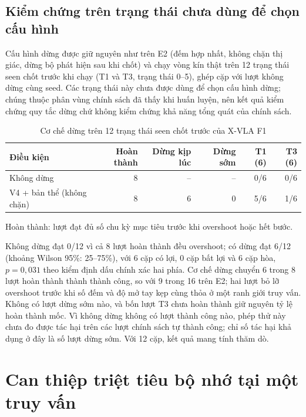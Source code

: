 \subsection{Kiểm chứng trên trạng thái chưa dùng để chọn cấu hình}
\label{sec:halt-seen12}

Cấu hình dừng được giữ nguyên như trên E2 (đếm hợp nhất, không chặn thị giác, dừng bộ phát hiện sau khi chốt) và chạy vòng kín thật trên 12 trạng thái seen chốt trước khi chạy (T1 và T3, trạng thái 0--5), ghép cặp với lượt không dừng cùng seed. Các trạng thái này chưa được dùng để chọn cấu hình dừng; chúng thuộc phân vùng chính sách đã thấy khi huấn luyện, nên kết quả kiểm chứng quy tắc dừng chứ không kiểm chứng khả năng tổng quát của chính sách.

\begin{table}[htbp]
\centering\small
\caption{Cơ chế dừng trên 12 trạng thái seen chốt trước của X-VLA F1}
\label{tab:halt-seen12}
\begin{tabular}{l|r|r|r|r|r}
\toprule
\textbf{Điều kiện} & \textbf{Hoàn thành} & \textbf{Dừng kịp lúc} & \textbf{Dừng sớm} & \textbf{T1 (6)} & \textbf{T3 (6)} \\
\midrule
Không dừng & 8 & -- & -- & 0/6 & 0/6 \\
V4 + bản thể (không chặn) & 8 & 6 & 0 & 5/6 & 1/6 \\
\bottomrule
\end{tabular}
\par\smallskip
{\footnotesize Hoàn thành: lượt đạt đủ số chu kỳ mục tiêu trước khi overshoot hoặc hết bước.\par}
\end{table}

Không dừng đạt 0/12 vì cả 8 lượt hoàn thành đều overshoot; có dừng đạt 6/12 (khoảng Wilson 95\%: 25--75\%), với 6 cặp có lợi, 0 cặp bất lợi và 6 cặp hòa, $p = 0{,}031$ theo kiểm định dấu chính xác hai phía. Cơ chế dừng chuyển 6 trong 8 lượt hoàn thành thành thành công, so với 9 trong 16 trên E2; hai lượt bỏ lỡ overshoot trước khi số đếm và độ mở tay kẹp cùng thỏa ở một ranh giới truy vấn. Không có lượt dừng sớm nào, và bốn lượt T3 chưa hoàn thành giữ nguyên tỷ lệ hoàn thành mốc. Vì không dừng không có lượt thành công nào, phép thử này chưa đo được tác hại trên các lượt chính sách tự thành công; chỉ số tác hại khả dụng ở đây là số lượt dừng sớm. Với 12 cặp, kết quả mang tính thăm dò.

\section{Can thiệp triệt tiêu bộ nhớ tại một truy vấn}
\label{sec:e45-one-query}

